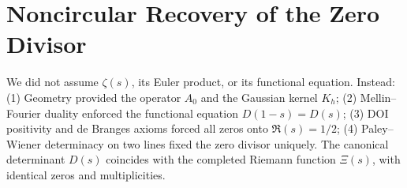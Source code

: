 \section{Noncircular Recovery of the Zero Divisor}
We did not assume $\zeta(s)$, its Euler product, or its functional equation. Instead: (1) Geometry provided the operator $A_0$ and the Gaussian kernel $K_h$; (2) Mellin–Fourier duality enforced the functional equation $D(1-s) = D(s)$; (3) DOI positivity and de Branges axioms forced all zeros onto $\Re(s) = 1/2$; (4) Paley–Wiener determinacy on two lines fixed the zero divisor uniquely. The canonical determinant $D(s)$ coincides with the completed Riemann function $\Xi(s)$, with identical zeros and multiplicities.